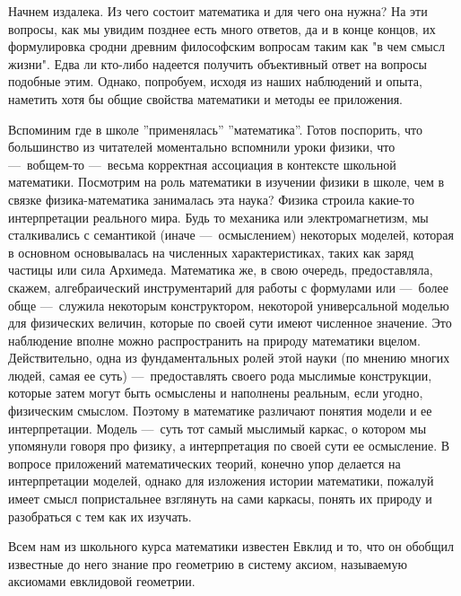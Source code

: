 \documentclass[math.tex]{subfiles}
\begin{document}
	Начнем издалека.
Из чего состоит математика и для чего она нужна?
На эти вопросы, как мы увидим позднее есть много ответов, да и в конце концов, их формулировка сродни древним философским вопросам таким как "в чем смысл жизни".
Едва ли кто-либо надеется получить объективный ответ на вопросы \linebreak подобные этим.
Однако, попробуем, исходя из наших наблюдений и опыта, \linebreak наметить хотя бы общие свойства математики и методы ее приложения.

	Вспоминим где в школе ''применялась'' ''математика''. 
Готов поспорить, что большинство из читателей моментально вспомнили уроки физики, что —\ вобщем-то —\ весьма корректная ассоциация в контексте школьной математики.
Посмотрим на роль математики в изучении физики в школе, чем в связке физика-математика занималась эта наука?
Физика строила какие-то интерпретации реального мира.
Будь то механика или электромагнетизм, мы сталкивались с семантикой (иначе —\ осмыслением) некоторых моделей, которая в основном основывалась на численных характеристиках, таких как заряд частицы или сила Архимеда.
Математика же, в свою очередь, предоставляла, скажем, алгебраический инструментарий для работы с формулами или —\ более обще —\ служила некоторым конструктором, некоторой универсальной моделью для физических величин, которые по своей сути имеют численное значение.
Это наблюдение вполне можно распространить на природу математики вцелом.
Действительно, одна из фундаментальных ролей этой науки (по мнению многих людей, самая ее суть) —\ предоставлять своего рода мыслимые конструкции, ко\-то\-рые затем могут быть осмыслены и наполнены реальным, если угодно, физи\-ческим смыслом.
Поэтому в математике различают понятия модели и ее интерпретации.
Модель —\ суть тот самый мыслимый каркас, о котором мы упомянули говоря про физику, а интерпретация по своей сути ее осмысление.
В вопросе приложений математических теорий, конечно упор делается на интер\-претации моделей, однако для изложения истории математики, пожалуй име\-ет смысл попристальнее взглянуть на сами каркасы, понять их природу и разоб\-раться с тем как их изучать.

	Всем нам из школьного курса математики известен Евклид и то, что он обобщил известные до него знание про геометрию в систему аксиом, называемую аксиомами евклидовой геомет\-рии.
\end{document}
